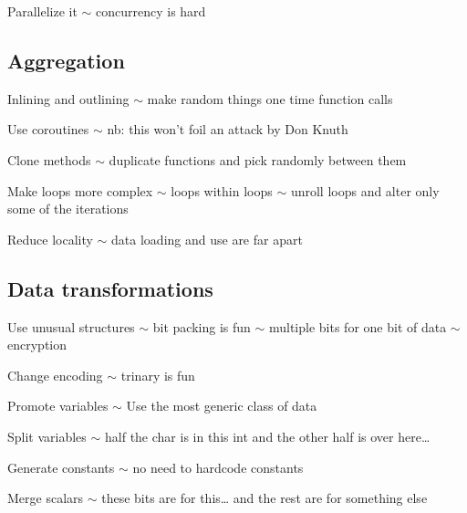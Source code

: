 Parallelize it \ensuremath{\sim} concurrency is hard

\subsection{Aggregation}

Inlining and outlining \ensuremath{\sim} make random things one time
function calls

Use coroutines \ensuremath{\sim} nb: this won't foil an attack by Don
Knuth

Clone methods \ensuremath{\sim} duplicate functions and pick randomly
between them

Make loops more complex \ensuremath{\sim} loops within loops
\ensuremath{\sim} unroll loops and alter only some of the iterations

Reduce locality \ensuremath{\sim} data loading and use are far apart

\subsection{Data transformations}

Use unusual structures \ensuremath{\sim} bit packing is fun
\ensuremath{\sim} multiple bits for one bit of data \ensuremath{\sim}
encryption

Change encoding \ensuremath{\sim} trinary is fun

Promote variables \ensuremath{\sim} Use the most generic class of data

Split variables \ensuremath{\sim} half the char is in this int and the
other half is over here\ldots{}

Generate constants \ensuremath{\sim} no need to hardcode constants

Merge scalars \ensuremath{\sim} these bits are for this\ldots{} and the
rest are for something else
